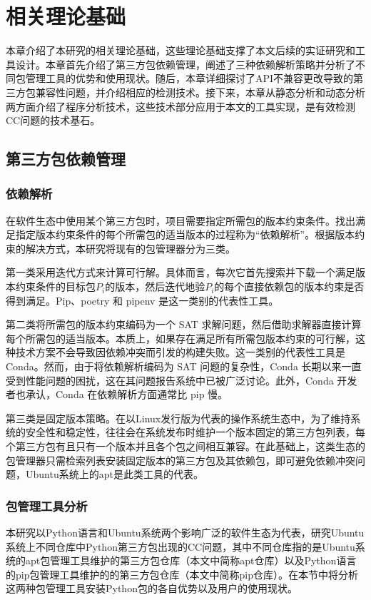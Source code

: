 \chapter{相关理论基础}
本章介绍了本研究的相关理论基础，这些理论基础支撑了本文后续的实证研究和工具设计。本章首先介绍了第三方包依赖管理，阐述了三种依赖解析策略并分析了不同包管理工具的优势和使用现状。随后，本章详细探讨了API不兼容更改导致的第三方包兼容性问题，并介绍相应的检测技术。接下来，本章从静态分析和动态分析两方面介绍了程序分析技术，这些技术部分应用于本文的工具实现，是有效检测CC问题的技术基石。

\section{第三方包依赖管理}
\subsection{依赖解析}\label{2.1.1}
在软件生态中使用某个第三方包时，项目需要指定所需包的版本约束条件。找出满足指定版本约束条件的每个所需包的适当版本的过程称为“依赖解析”。根据版本约束的解决方式，本研究将现有的包管理器分为三类。

第一类采用迭代方式来计算可行解。具体而言，每次它首先搜索并下载一个满足版本约束条件的目标包$P_{i}$的版本，然后迭代地验$P_{i}$的每个直接依赖包的版本约束是否得到满足。Pip、poetry 和 pipenv 是这一类别的代表性工具。

第二类将所需包的版本约束编码为一个 SAT 求解问题，然后借助求解器直接计算每个所需包的适当版本。本质上，如果存在满足所有所需包版本约束的可行解，这种技术方案不会导致因依赖冲突而引发的构建失败。这一类别的代表性工具是 Conda。然而，由于将依赖解析编码为 SAT 问题的复杂性，Conda 长期以来一直受到性能问题的困扰，这在其问题报告系统中已被广泛讨论。此外，Conda 开发者也承认，Conda 在依赖解析方面通常比 pip 慢。

第三类是固定版本策略。在以Linux发行版为代表的操作系统生态中，为了维持系统的安全性和稳定性，往往会在系统发布时维护一个版本固定的第三方包列表，每个第三方包有且只有一个版本并且各个包之间相互兼容。在此基础上，这类生态的包管理器只需检索列表安装固定版本的第三方包及其依赖包，即可避免依赖冲突问题，Ubuntu系统上的apt是此类工具的代表。

\subsection{包管理工具分析}
本研究以Python语言和Ubuntu系统两个影响广泛的软件生态为代表，研究Ubuntu系统上不同仓库中Python第三方包出现的CC问题，其中不同仓库指的是Ubuntu系统的apt包管理工具维护的第三方包仓库（本文中简称apt仓库）以及Python语言的pip包管理工具维护的的第三方包仓库（本文中简称pip仓库）。在本节中将分析这两种包管理工具安装Python包的各自优势以及用户的使用现状。

